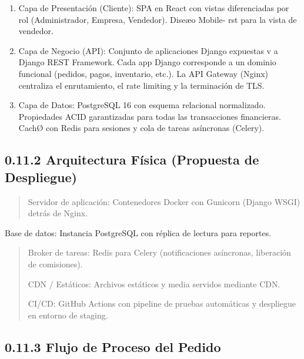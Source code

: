 \documentclass[
]{article}
\begin{document}
\begin{enumerate}
\def\labelenumi{\arabic{enumi}.}
\item
  Capa de Presentación (Cliente): SPA en React con vistas diferenciadas
  por rol (Administrador, Empresa, Vendedor). Diseæo Mobile- rst para la
  vista de vendedor.
\item
  Capa de Negocio (API): Conjunto de aplicaciones Django expuestas v a
  Django REST Framework. Cada app Django corresponde a un dominio
  funcional (pedidos, pagos, inventario, etc.). La API Gateway (Nginx)
  centraliza el enrutamiento, el rate limiting y la terminación de TLS.
\item
  Capa de Datos: PostgreSQL 16 con esquema relacional normalizado.
  Propiedades ACID garantizadas para todas las transacciones
  financieras. CachØ con Redis para sesiones y cola de tareas asíncronas
  (Celery).
\end{enumerate}

\subsection{0.11.2 Arquitectura Física (Propuesta de
Despliegue)}\label{arquitectura-fuxedsica-propuesta-de-despliegue}

\begin{quote}
Servidor de aplicación: Contenedores Docker con Gunicorn (Django WSGI)
detrás de Nginx.
\end{quote}

Base de datos: Instancia PostgreSQL con réplica de lectura para
reportes.

\begin{quote}
Broker de tareas: Redis para Celery (notificaciones asíncronas,
liberación de comisiones).

CDN / Estáticos: Archivos estáticos y media servidos mediante CDN.

CI/CD: GitHub Actions con pipeline de pruebas automáticas y despliegue
en entorno de staging.
\end{quote}

\subsection{0.11.3 Flujo de Proceso del
Pedido}\label{flujo-de-proceso-del-pedido}
\end{document}

